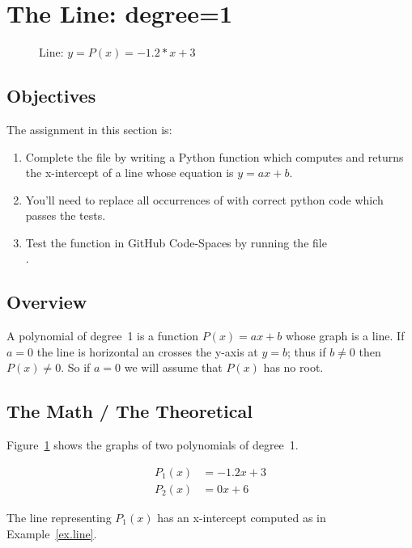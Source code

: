 \section{The Line: degree=1}
\label{sec.line}

\begin{figure}
  \centering
  
  \caption{Line: $y = P(x) = -1.2*x + 3$}
  \label{fig.line}
\end{figure}


\subsection{Objectives}
The assignment in this section is:
\begin{enumerate}
\item Complete the file  by writing a Python
  function which computes and returns the x-intercept of a line whose
  equation is ${y=a x + b}$.
\item You'll need to replace all occurrences of 
  with correct python code which passes the tests.

\item Test the function in GitHub Code-Spaces by running the file\\
  .
\end{enumerate}

\subsection{Overview}


A polynomial of degree~1 is a function $P(x)=a x + b$ whose graph is a line.   If $a=0$ the
line is horizontal an crosses the y-axis at $y=b$; thus if $b\neq 0$ then $P(x)\neq 0$.
So if $a=0$ we will assume that $P(x)$ has no root.   

\subsection{The Math / The Theoretical}


Figure~\ref{fig.line} shows the graphs of two polynomials of degree~1.

\begin{align*}
  P_1(x) &= -1.2 x + 3\\
  P_2(x) &= 0 x + 6
\end{align*}

The line representing $P_1(x)$ has an x-intercept computed as in Example~\ref{ex.line}.


